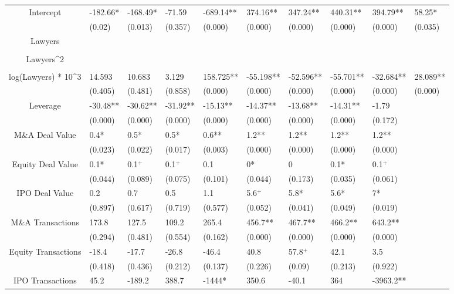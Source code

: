 \documentclass{article}
\begin{document}
\begin{table}[H]
\begin{tabular}{|clllllllll|}
Intercept & -182.66* & -168.49* & -71.59 & -689.14** & 374.16** & 347.24** & 440.31** & 394.79** & 58.25* \\ 
   & (0.02) & (0.013) & (0.357) & (0.000) & (0.000) & (0.000) & (0.000) & (0.000) & (0.035) \\ 
  Lawyers &  &  &  &  &  &  &  &  &  \\ 
   &  &  &  &  &  &  &  &  &  \\ 
  Lawyers^2 &  &  &  &  &  &  &  &  &  \\ 
   &  &  &  &  &  &  &  &  &  \\ 
  log(Lawyers) * 10^3 & 14.593 & 10.683 & 3.129 & 158.725** & -55.198** & -52.596** & -55.701** & -32.684** & 28.089** \\ 
   & (0.405) & (0.481) & (0.858) & (0.000) & (0.000) & (0.000) & (0.000) & (0.000) & (0.000) \\ 
  Leverage & -30.48** & -30.62** & -31.92** & -15.13** & -14.37** & -13.68** & -14.31** & -1.79 &  \\ 
   & (0.000) & (0.000) & (0.000) & (0.000) & (0.000) & (0.000) & (0.000) & (0.172) &  \\ 
  M\&A Deal Value & 0.4* & 0.5* & 0.5* & 0.6** & 1.2** & 1.2** & 1.2** & 1.2** &  \\ 
   & (0.023) & (0.022) & (0.017) & (0.003) & (0.000) & (0.000) & (0.000) & (0.000) &  \\ 
  Equity Deal Value & 0.1* & 0.1$^{+}$ & 0.1$^{+}$ & 0.1 & 0* & 0 & 0.1* & 0.1$^{+}$ &  \\ 
   & (0.044) & (0.089) & (0.075) & (0.101) & (0.044) & (0.173) & (0.035) & (0.061) &  \\ 
  IPO Deal Value & 0.2 & 0.7 & 0.5 & 1.1 & 5.6$^{+}$ & 5.8* & 5.6* & 7* &  \\ 
   & (0.897) & (0.617) & (0.719) & (0.577) & (0.052) & (0.041) & (0.049) & (0.019) &  \\ 
  M\&A Transactions & 173.8 & 127.5 & 109.2 & 265.4 & 456.7** & 467.7** & 466.2** & 643.2** &  \\ 
   & (0.294) & (0.481) & (0.554) & (0.162) & (0.000) & (0.000) & (0.000) & (0.000) &  \\ 
  Equity Transactions & -18.4 & -17.7 & -26.8 & -46.4 & 40.8 & 57.8$^{+}$ & 42.1 & 3.5 &  \\ 
   & (0.418) & (0.436) & (0.212) & (0.137) & (0.226) & (0.09) & (0.213) & (0.922) &  \\ 
  IPO Transactions & 45.2 & -189.2 & 388.7 & -1444* & 350.6 & -40.1 & 364 & -3963.2** &  \\ 

\end{tabular}
\end{table}
\end{document}
